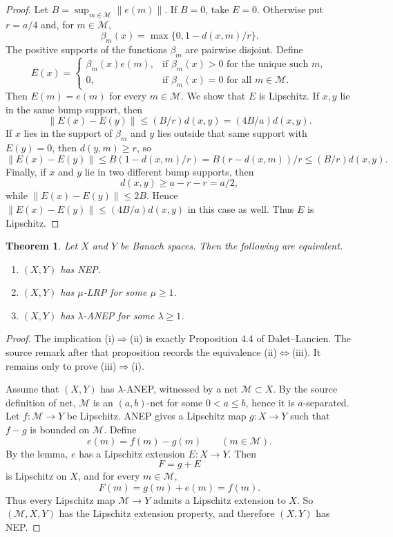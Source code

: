 \documentclass[11pt]{article}
\newtheorem*{theorem}{Theorem}
\newcommand{\M}{\mathcal M}
\begin{document}
\begin{proof}
Let \(B=\sup_{m\in \M}\|e(m)\|\).  If \(B=0\), take \(E=0\).  Otherwise put
\(r=a/4\) and, for \(m\in \M\),
\[
  \beta_m(x)=\max\{0,1-d(x,m)/r\}.
\]
The positive supports of the functions \(\beta_m\) are pairwise disjoint.
Define
\[
  E(x)=
  \begin{cases}
    \beta_m(x)e(m), & \text{if } \beta_m(x)>0 \text{ for the unique such }m,\\
    0, & \text{if } \beta_m(x)=0 \text{ for all }m\in\M .
  \end{cases}
\]
Then \(E(m)=e(m)\) for every \(m\in\M\).  We show that \(E\) is Lipschitz.
If \(x,y\) lie in the same bump support, then
\[
  \|E(x)-E(y)\|\le (B/r)d(x,y)= (4B/a)d(x,y).
\]
If \(x\) lies in the support of \(\beta_m\) and \(y\) lies outside that same
support with \(E(y)=0\), then \(d(y,m)\ge r\), so
\[
  \|E(x)-E(y)\|\le B(1-d(x,m)/r)
  = B(r-d(x,m))/r \le (B/r)d(x,y).
\]
Finally, if \(x\) and \(y\) lie in two different bump supports, then
\[
  d(x,y)\ge a-r-r=a/2,
\]
while \(\|E(x)-E(y)\|\le 2B\).  Hence
\(\|E(x)-E(y)\|\le (4B/a)d(x,y)\) in this case as well.  Thus \(E\) is
Lipschitz.
\end{proof}

\begin{theorem}
Let \(X\) and \(Y\) be Banach spaces.  Then the following are equivalent.
\begin{enumerate}[label=(\roman*)]
\item \((X,Y)\) has NEP.
\item \((X,Y)\) has \(\mu\)-LRP for some \(\mu\ge 1\).
\item \((X,Y)\) has \(\lambda\)-ANEP for some \(\lambda\ge 1\).
\end{enumerate}
\end{theorem}

\begin{proof}
The implication (i)\(\Rightarrow\)(ii) is exactly Proposition 4.4 of
Dalet--Lancien.  The source remark after that proposition records the
equivalence (ii)\(\Leftrightarrow\)(iii).  It remains only to prove
(iii)\(\Rightarrow\)(i).

Assume that \((X,Y)\) has \(\lambda\)-ANEP, witnessed by a net
\(\M\subset X\).  By the source definition of net, \(\M\) is an
\((a,b)\)-net for some \(0<a\le b\), hence it is \(a\)-separated.  Let
\(f:\M\to Y\) be Lipschitz.  ANEP gives a Lipschitz map \(g:X\to Y\) such
that \(f-g\) is bounded on \(\M\).  Define
\[
  e(m)=f(m)-g(m)\qquad (m\in\M).
\]
By the lemma, \(e\) has a Lipschitz extension \(E:X\to Y\).  Then
\[
  F=g+E
\]
is Lipschitz on \(X\), and for every \(m\in\M\),
\[
  F(m)=g(m)+e(m)=f(m).
\]
Thus every Lipschitz map \(\M\to Y\) admits a Lipschitz extension to \(X\).
So \((\M,X,Y)\) has the Lipschitz extension property, and therefore
\((X,Y)\) has NEP.
\end{proof}
\end{document}
